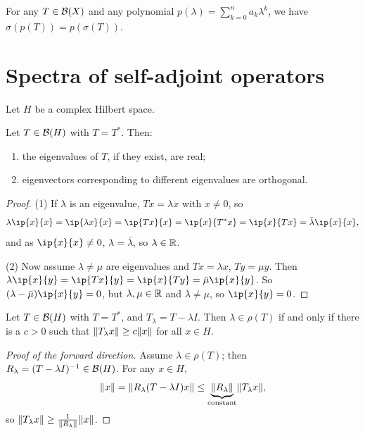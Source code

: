 \begin{theorem}\label{thm:spectral-mapping}
For any $T \in \mathcal{B}(X)$ and any polynomial
$p(\lambda) = \sum_{k=0}^{n} a_k \lambda^k$, we have
$\sigma(p(T)) = p(\sigma(T))$.
\end{theorem}

\section{Spectra of self-adjoint operators}

Let $H$ be a complex Hilbert space.

\begin{theorem}\label{thm:sa-eigen}
Let $T \in \mathcal{B}(H)$ with $T = T^*$. Then:
\begin{enumerate}
  \item the eigenvalues of $T$, if they exist, are real;
  \item eigenvectors corresponding to different eigenvalues are orthogonal.
\end{enumerate}
\end{theorem}

\begin{proof}
(1) If $\lambda$ is an eigenvalue, $Tx = \lambda x$ with $x \ne 0$, so
\[
  \lambda\ip{x}{x} = \ip{\lambda x}{x} = \ip{Tx}{x} = \ip{x}{T^* x}
  = \ip{x}{Tx} = \bar{\lambda}\ip{x}{x} ,
\]
and as $\ip{x}{x} \ne 0$, $\lambda = \bar{\lambda}$, so $\lambda \in \mathbb{R}$.

(2) Now assume $\lambda \ne \mu$ are eigenvalues and $Tx = \lambda x$,
$Ty = \mu y$. Then
$\lambda\ip{x}{y} = \ip{Tx}{y} = \ip{x}{Ty} = \bar{\mu}\ip{x}{y}$. So
$(\lambda - \bar{\mu})\ip{x}{y} = 0$, but $\lambda, \mu \in \mathbb{R}$ and
$\lambda \ne \mu$, so $\ip{x}{y} = 0$.
\end{proof}

\begin{lemma}\label{lem:sa-regular}
Let $T \in \mathcal{B}(H)$ with $T = T^*$, and $T_\lambda = T - \lambda I$. Then
$\lambda \in \rho(T)$ if and only if there is a $c > 0$ such that
$\lVert T_\lambda x\rVert \ge c\lVert x\rVert$ for all $x \in H$.
\end{lemma}

\begin{proof}[Proof of the forward direction]
Assume $\lambda \in \rho(T)$; then $R_\lambda = (T - \lambda I)^{-1} \in
\mathcal{B}(H)$. For any $x \in H$,
\[
  \lVert x\rVert = \lVert R_\lambda (T - \lambda I) x\rVert
  \le \underbrace{\lVert R_\lambda\rVert}_{\text{constant}} \lVert T_\lambda x\rVert ,
\]
so $\lVert T_\lambda x\rVert \ge \frac{1}{\lVert R_\lambda\rVert} \lVert x\rVert$.
\end{proof}

